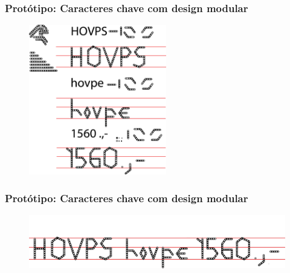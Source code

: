 \documentclass{beamer}
\begin{document}
\begin{frame}
\frametitle{Protótipo: Caracteres chave com design modular}
\begin{figure}[htp]
\begin{center}
  \includegraphics[width=60mm]{imagens/Lego.png}
\end{center}
\end{figure}
\end{frame}

\begin{frame}
\frametitle{Protótipo: Caracteres chave com design modular}
\begin{figure}[htp]
\begin{center}
  \includegraphics[width=\linewidth]{imagens/Lego1Linha.png}
\end{center}
\end{figure}
\end{frame}
\end{document}
